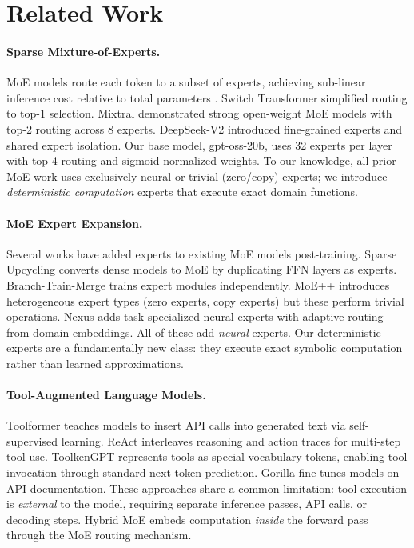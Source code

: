 \section{Related Work}
\label{sec:related}

\paragraph{Sparse Mixture-of-Experts.}
MoE models route each token to a subset of experts, achieving
sub-linear inference cost relative to total parameters
\citep{shazeer2017outrageously,lepikhin2021gshard}. Switch Transformer
\citep{fedus2022switch} simplified routing to top-1 selection.
Mixtral \citep{jiang2024mixtral} demonstrated strong open-weight MoE
models with top-2 routing across 8 experts. DeepSeek-V2
\citep{deepseekai2024deepseekv2} introduced fine-grained experts and
shared expert isolation. Our base model, gpt-oss-20b, uses 32 experts
per layer with top-4 routing and sigmoid-normalized weights. To our knowledge, all prior MoE work uses exclusively neural or
trivial (zero/copy) experts; we introduce \emph{deterministic
computation} experts that execute exact domain functions.

\paragraph{MoE Expert Expansion.}
Several works have added experts to existing MoE models post-training.
Sparse Upcycling \citep{komatsuzaki2023sparse} converts dense models
to MoE by duplicating FFN layers as experts. Branch-Train-Merge
\citep{li2022branch} trains expert modules independently. MoE++
\citep{jin2024moepp} introduces heterogeneous expert types (zero
experts, copy experts) but these perform trivial operations. Nexus
\citep{gritsch2024nexus} adds task-specialized neural experts with
adaptive routing from domain embeddings. All of these add \emph{neural} experts.
Our deterministic experts are a fundamentally new class: they execute
exact symbolic computation rather than learned approximations.

\paragraph{Tool-Augmented Language Models.}
Toolformer \citep{schick2023toolformer} teaches models to insert API
calls into generated text via self-supervised learning. ReAct
\citep{yao2023react} interleaves reasoning and action traces for
multi-step tool use. ToolkenGPT \citep{hao2023toolkengpt} represents
tools as special vocabulary tokens, enabling tool invocation through
standard next-token prediction. Gorilla \citep{patil2023gorilla}
fine-tunes models on API documentation. These approaches share a common
limitation: tool execution is \emph{external} to the model, requiring
separate inference passes, API calls, or decoding steps. Hybrid MoE
embeds computation \emph{inside} the forward pass through the MoE
routing mechanism.

